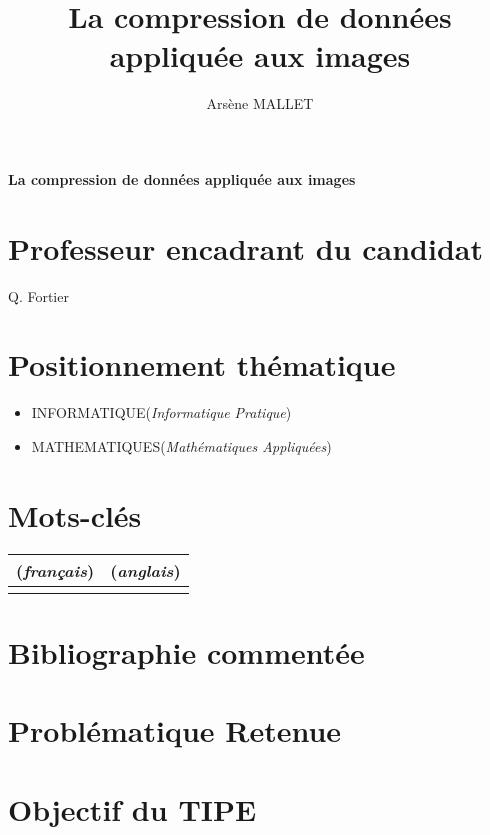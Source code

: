 \documentclass[a4paper, 11pt]{article}
\author{Arsène MALLET}
\title{La compression de donn\'ees appliqu\'ee aux images}
\begin{document}
    
\begin{center}
    {\textbf {\LARGE La compression de donn\'ees appliqu\'ee aux images}}
\end{center}

\vspace{5mm}


\section*{Professeur encadrant du candidat}
Q. Fortier

\section*{Positionnement th\'ematique}
\begin{itemize}
    \item INFORMATIQUE(\textit{Informatique Pratique})
    \item MATHEMATIQUES(\textit{Math\'ematiques Appliqu\'ees})
\end{itemize}

\section*{Mots-cl\'es}

\begin{tabular}{l l} 
    (\textit{français}) & (\textit{anglais}) \\ \hline
     & \\
    \end{tabular}

\section*{Bibliographie comment\'ee}


\section*{Probl\'ematique Retenue}

\section*{Objectif du TIPE}
\begin{enumerate}
\end{enumerate}


\printbibliography[title=Références bibliographiques]
\end{document}
